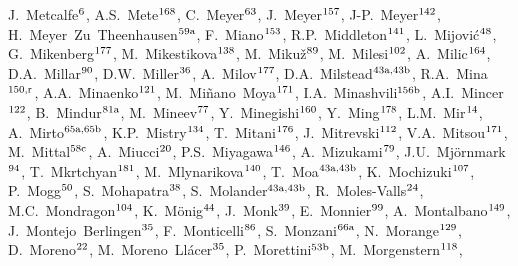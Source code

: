 \begin{flushleft}
J.~Metcalfe$^\textrm{\scriptsize 6}$,    
A.S.~Mete$^\textrm{\scriptsize 168}$,    
C.~Meyer$^\textrm{\scriptsize 63}$,    
J.~Meyer$^\textrm{\scriptsize 157}$,    
J-P.~Meyer$^\textrm{\scriptsize 142}$,    
H.~Meyer~Zu~Theenhausen$^\textrm{\scriptsize 59a}$,    
F.~Miano$^\textrm{\scriptsize 153}$,    
R.P.~Middleton$^\textrm{\scriptsize 141}$,    
L.~Mijovi\'{c}$^\textrm{\scriptsize 48}$,    
G.~Mikenberg$^\textrm{\scriptsize 177}$,    
M.~Mikestikova$^\textrm{\scriptsize 138}$,    
M.~Miku\v{z}$^\textrm{\scriptsize 89}$,    
M.~Milesi$^\textrm{\scriptsize 102}$,    
A.~Milic$^\textrm{\scriptsize 164}$,    
D.A.~Millar$^\textrm{\scriptsize 90}$,    
D.W.~Miller$^\textrm{\scriptsize 36}$,    
A.~Milov$^\textrm{\scriptsize 177}$,    
D.A.~Milstead$^\textrm{\scriptsize 43a,43b}$,    
R.A.~Mina$^\textrm{\scriptsize 150,r}$,    
A.A.~Minaenko$^\textrm{\scriptsize 121}$,    
M.~Mi\~nano~Moya$^\textrm{\scriptsize 171}$,    
I.A.~Minashvili$^\textrm{\scriptsize 156b}$,    
A.I.~Mincer$^\textrm{\scriptsize 122}$,    
B.~Mindur$^\textrm{\scriptsize 81a}$,    
M.~Mineev$^\textrm{\scriptsize 77}$,    
Y.~Minegishi$^\textrm{\scriptsize 160}$,    
Y.~Ming$^\textrm{\scriptsize 178}$,    
L.M.~Mir$^\textrm{\scriptsize 14}$,    
A.~Mirto$^\textrm{\scriptsize 65a,65b}$,    
K.P.~Mistry$^\textrm{\scriptsize 134}$,    
T.~Mitani$^\textrm{\scriptsize 176}$,    
J.~Mitrevski$^\textrm{\scriptsize 112}$,    
V.A.~Mitsou$^\textrm{\scriptsize 171}$,    
M.~Mittal$^\textrm{\scriptsize 58c}$,    
A.~Miucci$^\textrm{\scriptsize 20}$,    
P.S.~Miyagawa$^\textrm{\scriptsize 146}$,    
A.~Mizukami$^\textrm{\scriptsize 79}$,    
J.U.~Mj\"ornmark$^\textrm{\scriptsize 94}$,    
T.~Mkrtchyan$^\textrm{\scriptsize 181}$,    
M.~Mlynarikova$^\textrm{\scriptsize 140}$,    
T.~Moa$^\textrm{\scriptsize 43a,43b}$,    
K.~Mochizuki$^\textrm{\scriptsize 107}$,    
P.~Mogg$^\textrm{\scriptsize 50}$,    
S.~Mohapatra$^\textrm{\scriptsize 38}$,    
S.~Molander$^\textrm{\scriptsize 43a,43b}$,    
R.~Moles-Valls$^\textrm{\scriptsize 24}$,    
M.C.~Mondragon$^\textrm{\scriptsize 104}$,    
K.~M\"onig$^\textrm{\scriptsize 44}$,    
J.~Monk$^\textrm{\scriptsize 39}$,    
E.~Monnier$^\textrm{\scriptsize 99}$,    
A.~Montalbano$^\textrm{\scriptsize 149}$,    
J.~Montejo~Berlingen$^\textrm{\scriptsize 35}$,    
F.~Monticelli$^\textrm{\scriptsize 86}$,    
S.~Monzani$^\textrm{\scriptsize 66a}$,    
N.~Morange$^\textrm{\scriptsize 129}$,    
D.~Moreno$^\textrm{\scriptsize 22}$,    
M.~Moreno~Ll\'acer$^\textrm{\scriptsize 35}$,    
P.~Morettini$^\textrm{\scriptsize 53b}$,    
M.~Morgenstern$^\textrm{\scriptsize 118}$,    

\end{flushleft}
